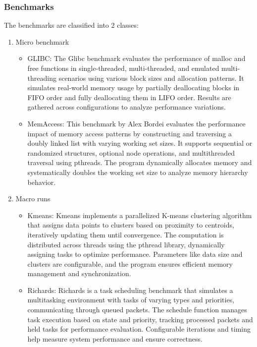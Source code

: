 \documentclass[11pt]{article}
\begin{document}
\subsubsection{Benchmarks}
\label{sec:org76c5486}
The benchmarks\cite{Benchmark} are classified into 2 classes:

\begin{enumerate}
\item Micro benchmark
\label{sec:org2f3b3d3}
\begin{itemize}
\item GLIBC: The Glibc benchmark evaluates the performance of
malloc and free functions in single-threaded, multi-threaded,
and emulated multi-threading scenarios using various block sizes and
allocation patterns. It simulates real-world memory usage by partially
deallocating blocks in FIFO order and fully deallocating them in LIFO order.
Results are gathered across configurations to analyze performance variations.
\item MemAccess: This benchmark by Alex Bordei evaluates the performance impact of
memory access patterns by constructing and traversing a doubly
linked list with varying working set sizes. It supports sequential or
randomized structures, optional node operations, and multithreaded
traversal using pthreads. The program dynamically allocates memory and systematically
doubles the working set size to analyze memory hierarchy behavior.
\end{itemize}

\item Macro runs
\label{sec:org1d39860}
\begin{itemize}
\item Kmeans: Kmeans implements a parallelized K-means clustering algorithm that
assigns data points to clusters based on proximity to centroids,
iteratively updating them until convergence. The computation is
distributed across threads using the pthread library, dynamically
assigning tasks to optimize performance. Parameters like data size
and clusters are configurable, and the program ensures efficient
memory management and synchronization.
\item Richards: Richards is a task scheduling benchmark that simulates a
multitasking environment with tasks of varying types and priorities,
communicating through queued packets. The schedule function manages
task execution based on state and priority, tracking processed packets
and held tasks for performance evaluation. Configurable iterations and
timing help measure system performance and ensure correctness.
\end{itemize}
\end{enumerate}
\end{document}
